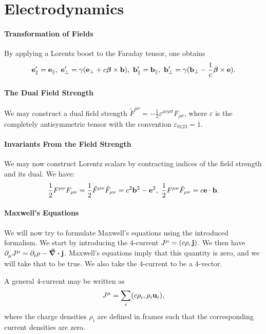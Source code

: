 \section{Electrodynamics}

\paragraph{Transformation of Fields}
By applying a Lorentz boost to the Faraday tensor, one obtains
\begin{align*}
	\vb{e}_{\parallel}^{\prime} = \vb{e}_{\parallel},\ \vb{e}_{\perp}^{\prime} = \gamma(\vb{e}_{\perp} + c\vb*{\beta}\times\vb{b}),\ \vb{b}_{\parallel}^{\prime} = \vb{b}_{\parallel},\ \vb{b}_{\perp}^{\prime} = \gamma(\vb{b}_{\perp} - \frac{1}{c}\vb*{\beta}\times\vb{e}).
\end{align*}

\paragraph{The Dual Field Strength}
We may construct a dual field strength $\tilde{F}^{\mu\nu} = -\frac{1}{2}\varepsilon^{\mu\nu\rho\sigma}F_{\rho\sigma}$, where $\varepsilon$ is the completely antisymmetric tensor with the convention $\varepsilon_{0123} = 1$.

\paragraph{Invariants From the Field Strength}
We may now construct Lorentz scalars by contracting indices of the field strength and its dual. We have:
\begin{align*}
	\frac{1}{2}F^{\mu\nu}F_{\mu\nu} = \frac{1}{2}\tilde{F}^{\mu\nu}\tilde{F}_{\mu\nu} = c^{2}\vb{b}^{2} - \vb{e}^{2},\ \frac{1}{2}F^{\mu\nu}\tilde{F}_{\mu\nu} = c\vb{e}\cdot\vb{b}.
\end{align*}

\paragraph{Maxwell's Equations}
We will now try to formulate Maxwell's equations using the introduced formalism. We start by introducing the $4$-current $J^{\mu} = (c\rho, \vb{j})$. We then have $\partial^{}_{\mu}J^{\mu} = \partial^{}_{t}\rho - \div{\vb{j}}$. Maxwell's equations imply that this quantity is zero, and we will take that to be true. We also take the $4$-current to be a $4$-vector.

A general $4$-current may be written as
\begin{align*}
	J^{\mu} = \sum\limits_{i}(c\rho_{i}, \rho_{i}\vb{u}_{i}),
\end{align*}
where the charge densities $\rho_{i}$ are defined in frames such that the corresponding current densities are zero.

